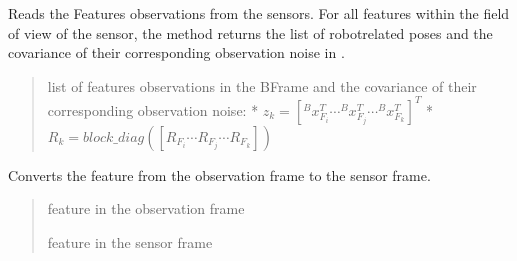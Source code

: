 \documentclass[letterpaper,10pt,english]{sphinxmanual}
\begin{document}
\begin{fulllineitems}
\begin{fulllineitems}
\label{\detokenize{FEKFMBLocalization:MapFeature.Cartesian2DStoredPolarObservedMapFeature.GetFeatures}}
\pysigstartsignatures
{}
\pysigstopsignatures
\sphinxAtStartPar
Reads the Features observations from the sensors. For all features within the field of view of the sensor, the
method returns the list of robot\sphinxhyphen{}related poses and the covariance of their corresponding observation noise in .
\begin{quote}\begin{description}
\sphinxAtStartPar
list of features observations in the B\sphinxhyphen{}Frame and the covariance of their corresponding observation noise:
* \(z_k=[^Bx_{F_i}^T \cdots ^Bx_{F_j}^T \cdots ^Bx_{F_k}^T]^T\)
* \(R_k=block\_diag([R_{F_i} \cdots R_{F_j} \cdots R_{F_k}])\)

\end{description}\end{quote}

\end{fulllineitems}


\begin{fulllineitems}
\label{\detokenize{FEKFMBLocalization:MapFeature.Cartesian2DStoredPolarObservedMapFeature.o2s}}
\pysigstartsignatures
{}
\pysigstopsignatures
\sphinxAtStartPar
Converts the feature from the observation frame to the sensor frame.
\begin{quote}\begin{description}
\sphinxAtStartPar
{} \textendash{} feature in the observation frame

\sphinxAtStartPar
feature in the sensor frame

\end{description}\end{quote}

\end{fulllineitems}



\end{fulllineitems}
\end{document}
